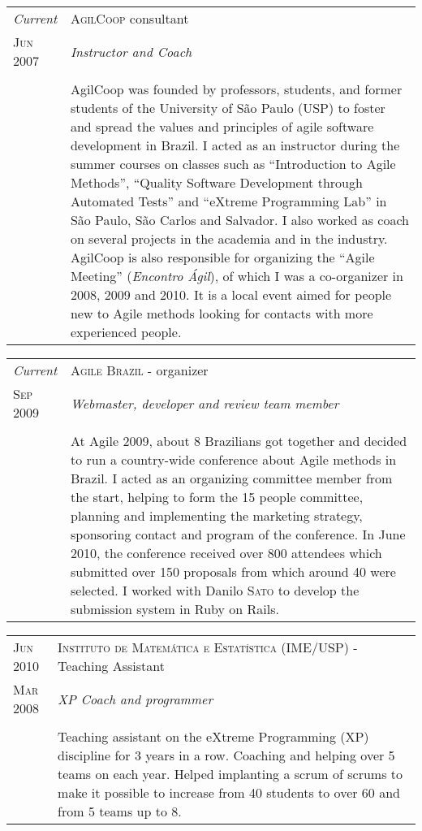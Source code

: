 \documentclass[letter,10pt]{article}
\begin{document}
\begin{tabular}{p{2.5cm}|p{13.5cm}}
  \emph{Current} & \textsc{AgilCoop} consultant\\
  \textsc{Jun 2007}& \emph{Instructor and Coach}\\
  &\\
  &AgilCoop was founded by professors,
  students, and former students of the University of São Paulo (USP)
  to foster and spread the values and principles of agile software
  development in Brazil. I acted as an instructor during the summer
  courses on classes such as ``Introduction to Agile Methods'',
  ``Quality Software Development through Automated Tests'' and
  ``eXtreme Programming Lab'' in São Paulo, São Carlos and Salvador.
  I also worked as coach on several projects in the academia
  and in the industry. AgilCoop is also responsible for organizing
  the ``Agile Meeting'' (\emph{Encontro Ágil}), of which I was a
  co-organizer in 2008, 2009 and 2010. It is a local
  event aimed for people new to Agile methods looking for contacts
  with more experienced people.
\end{tabular}

\begin{tabular}{p{2.5cm}|p{13.5cm}}
  \emph{Current} & \textsc{Agile Brazil} - organizer\\
  \textsc{Sep 2009}& \emph{Webmaster, developer and review team
    member}\\
  &\\
  &At Agile 2009, about 8 Brazilians got together and
  decided to run a country-wide conference about Agile methods in
  Brazil. I acted as an organizing committee member from the start, helping to form the
  15 people committee, planning and implementing the marketing
  strategy, sponsoring contact and program of the conference. In
  June 2010, the conference received over 800 attendees which
  submitted over 150 proposals from which around 40 were selected. I
  worked with Danilo \textsc{Sato} to develop the submission system in Ruby on
  Rails.
\end{tabular}

\begin{tabular}{p{2.5cm}|p{13.5cm}}
  \textsc{Jun 2010} & \textsc{Instituto de Matemática e Estatística
    (IME/USP)} - Teaching Assistant\\
  \textsc{Mar 2008}& \emph{XP Coach and programmer}\\
  &\\
  & Teaching assistant on the eXtreme Programming (XP) discipline for
  3 years in a row. Coaching and helping over 5 teams on each
  year. Helped implanting a scrum of scrums to make it possible to
  increase from 40 students to over 60 and from 5 teams up to 8.
\end{tabular}
\end{document}
